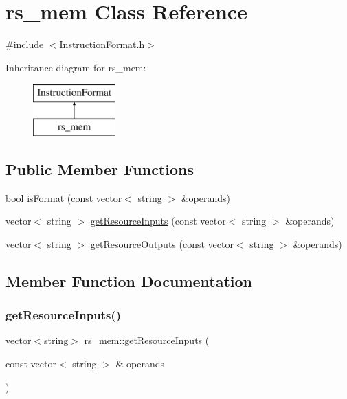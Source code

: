 \hypertarget{classrs__mem}{}\section{rs\+\_\+mem Class Reference}
\label{classrs__mem}


{\ttfamily \#include $<$Instruction\+Format.\+h$>$}

Inheritance diagram for rs\+\_\+mem\+:\begin{figure}[H]
\begin{center}
\leavevmode
\includegraphics[height=2.000000cm]{classrs__mem}
\end{center}
\end{figure}
\subsection*{Public Member Functions}
\begin{DoxyCompactItemize}
\item 
bool \hyperlink{classrs__mem_a81ea68538cb372c59b98d269fb0708c5}{is\+Format} (const vector$<$ string $>$ \&operands)
\item 
vector$<$ string $>$ \hyperlink{classrs__mem_a4296ae1f58884fe3a3d85a265a3657a8}{get\+Resource\+Inputs} (const vector$<$ string $>$ \&operands)
\item 
vector$<$ string $>$ \hyperlink{classrs__mem_a43c0456a0a59e714915e9d7b14e2246b}{get\+Resource\+Outputs} (const vector$<$ string $>$ \&operands)
\end{DoxyCompactItemize}


\subsection{Member Function Documentation}
\mbox{\label{classrs__mem_a4296ae1f58884fe3a3d85a265a3657a8}} 
\subsubsection{\texorpdfstring{get\+Resource\+Inputs()}{getResourceInputs()}}
{\footnotesize\ttfamily vector$<$string$>$ rs\+\_\+mem\+::get\+Resource\+Inputs (\begin{DoxyParamCaption}\item[{const vector$<$ string $>$ \&}]{operands }\end{DoxyParamCaption})\hspace{0.3cm}{\ttfamily [virtual]}}

